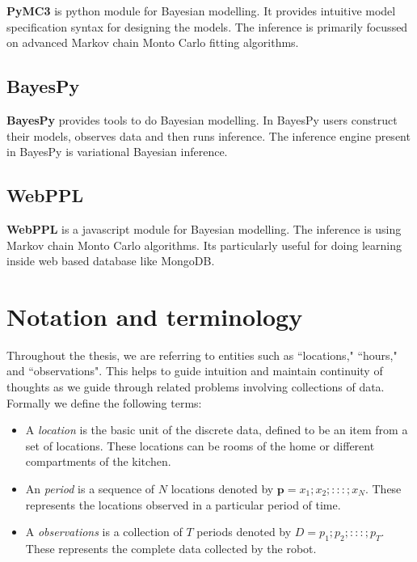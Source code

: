 \textbf{PyMC3} is python module for Bayesian modelling. It provides intuitive model specification syntax for designing the models. The inference is primarily focussed on advanced Markov chain Monto Carlo fitting algorithms.


\subsection{BayesPy}

\textbf{BayesPy} provides tools to do Bayesian modelling. In BayesPy users construct their models, observes data and then runs inference. The inference engine present in BayesPy is variational Bayesian inference.

\subsection{WebPPL}

\textbf{WebPPL} is a javascript module for Bayesian modelling. The inference is using Markov chain Monto Carlo algorithms. Its particularly useful for doing learning inside web based database like MongoDB.

\section{Notation and terminology}
Throughout the thesis, we are referring to entities such as ``locations," ``hours," and ``observations".
This helps to guide intuition and maintain continuity of thoughts as we guide through related problems involving collections of data.
Formally we define the following terms:
\begin{itemize}
	\item A \emph{location} is the basic unit of the discrete data, defined to be an item from a set of locations. These locations can be rooms of the home or different compartments of the kitchen. 
	\item An \emph{period} is a sequence of $N$ locations denoted by $\textbf{p} = {x_1;x_2;:::;x_N}$. These represents the locations observed in a particular period of time.
	\item A \emph{observations} is a collection of $T$ periods denoted by $ D = {p_1;p_2;:::;p_T}$. These represents the complete data collected by the robot.
\end{itemize}


